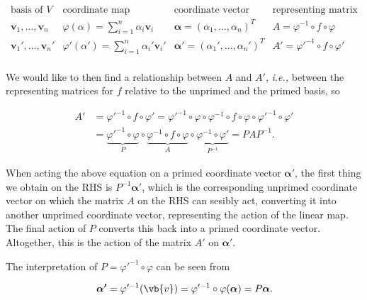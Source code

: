 \documentclass[a4paper,12pt]{report}
\begin{document}
\begin{equation}
\begin{array}{cccc}
\text{basis of } V & \text{coordinate map} & \text{coordinate vector} & \text{representing matrix} \\[10pt]
\bm{v}_1, \ldots, \bm{v}_n & \varphi(\alpha) = \sum_{i=1}^n \alpha_i \bm{v}_i & \bm{\alpha} = (\alpha_1, \ldots, \alpha_n)^T & A = \varphi^{-1} \circ f \circ \varphi \\[15pt]
\bm{v}_1', \ldots, \bm{v}_n' & \varphi'(\alpha') = \sum_{i=1}^n \alpha_i' \bm{v}_i' & \bm{\alpha}' = (\alpha_1', \ldots, \alpha_n')^T & A' = \varphi'^{-1} \circ f \circ \varphi' \\[10pt]
\end{array}
\end{equation}

We would like to then find a relationship between \(A\) and \(A'\), \textit{i.e.,} between the representing matrices for \(f\) relative to the unprimed and the primed basis, so

\begin{equation} \label{changeofbasis} 
    \begin{aligned}
        A' &= \varphi'^{-1} \circ f \circ \varphi' = \varphi'^{-1} \circ \varphi \circ \varphi^{-1} \circ f \circ \varphi \circ \varphi'^{-1} \circ \varphi' \\
           &= \underbrace{\varphi'^{-1} \circ \varphi}_{P} \circ \underbrace{\varphi^{-1} \circ f \circ \varphi}_{A} \circ \underbrace{\varphi^{-1} \circ \varphi'}_{P^{-1}} = P A P^{-1}.
    \end{aligned}
\end{equation}

When acting the above equation on a primed coordinate vector \(\boldsymbol{\alpha '} \), the first thing we obtain on the RHS is \(P^{-1} \boldsymbol{\alpha '} \), which is the corresponding unprimed coordinate vector on which the matrix \(A\) on the RHS can sesibly act, converting it into another unprimed coordinate vector, representing the action of the linear map. The final action of \(P\) converts this back into a primed coordinate vector. Altogether, this is the action of the matrix \(A'\) on \(\boldsymbol{\alpha '} \). 

The interpretation of \(P = \varphi '^{-1} \circ \varphi \) can be seen from 

\begin{equation}
    \boldsymbol{\alpha '} = \varphi '^{-1} (\vb{v} ) = \varphi '^{-1} \circ \varphi (\boldsymbol{\alpha } ) = P \boldsymbol{\alpha }.  
\end{equation}
\end{document}

